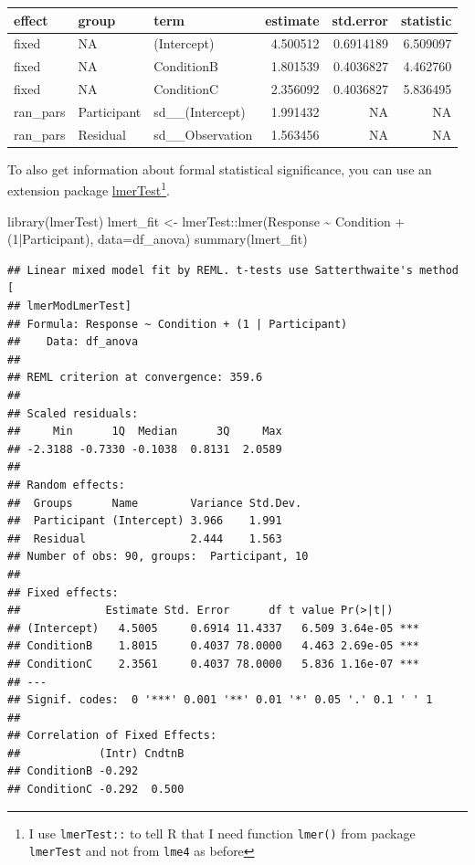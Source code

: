 \documentclass[
]{book}
\newenvironment{Shaded}{\begin{snugshade}}{\end{snugshade}}
\newcommand{\AttributeTok}[1]{\textcolor[rgb]{0.77,0.63,0.00}{#1}}
\newcommand{\DecValTok}[1]{\textcolor[rgb]{0.00,0.00,0.81}{#1}}
\newcommand{\FunctionTok}[1]{\textcolor[rgb]{0.00,0.00,0.00}{#1}}
\newcommand{\NormalTok}[1]{#1}
\newcommand{\OtherTok}[1]{\textcolor[rgb]{0.56,0.35,0.01}{#1}}
\newcommand{\SpecialCharTok}[1]{\textcolor[rgb]{0.00,0.00,0.00}{#1}}
\begin{document}
\begin{tabular}{l|l|l|r|r|r}
\hline
effect & group & term & estimate & std.error & statistic\\
\hline
fixed & NA & (Intercept) & 4.500512 & 0.6914189 & 6.509097\\
\hline
fixed & NA & ConditionB & 1.801539 & 0.4036827 & 4.462760\\
\hline
fixed & NA & ConditionC & 2.356092 & 0.4036827 & 5.836495\\
\hline
ran\_pars & Participant & sd\_\_(Intercept) & 1.991432 & NA & NA\\
\hline
ran\_pars & Residual & sd\_\_Observation & 1.563456 & NA & NA\\
\hline
\end{tabular}

To also get information about formal statistical significance, you can use an extension package \href{https://github.com/runehaubo/lmerTestR}{lmerTest}\footnote{I use \texttt{lmerTest::} to tell R that I need function \texttt{lmer()} from package \texttt{lmerTest} and not from \texttt{lme4} as before}.

\begin{Shaded}
\begin{Highlighting}[]
\FunctionTok{library}\NormalTok{(lmerTest)}
\NormalTok{lmert\_fit }\OtherTok{\textless{}{-}}\NormalTok{ lmerTest}\SpecialCharTok{::}\FunctionTok{lmer}\NormalTok{(Response }\SpecialCharTok{\textasciitilde{}}\NormalTok{ Condition }\SpecialCharTok{+}\NormalTok{ (}\DecValTok{1}\SpecialCharTok{|}\NormalTok{Participant), }\AttributeTok{data=}\NormalTok{df\_anova)}
\FunctionTok{summary}\NormalTok{(lmert\_fit)}
\end{Highlighting}
\end{Shaded}

\begin{verbatim}
## Linear mixed model fit by REML. t-tests use Satterthwaite's method [
## lmerModLmerTest]
## Formula: Response ~ Condition + (1 | Participant)
##    Data: df_anova
## 
## REML criterion at convergence: 359.6
## 
## Scaled residuals: 
##     Min      1Q  Median      3Q     Max 
## -2.3188 -0.7330 -0.1038  0.8131  2.0589 
## 
## Random effects:
##  Groups      Name        Variance Std.Dev.
##  Participant (Intercept) 3.966    1.991   
##  Residual                2.444    1.563   
## Number of obs: 90, groups:  Participant, 10
## 
## Fixed effects:
##             Estimate Std. Error      df t value Pr(>|t|)    
## (Intercept)   4.5005     0.6914 11.4337   6.509 3.64e-05 ***
## ConditionB    1.8015     0.4037 78.0000   4.463 2.69e-05 ***
## ConditionC    2.3561     0.4037 78.0000   5.836 1.16e-07 ***
## ---
## Signif. codes:  0 '***' 0.001 '**' 0.01 '*' 0.05 '.' 0.1 ' ' 1
## 
## Correlation of Fixed Effects:
##            (Intr) CndtnB
## ConditionB -0.292       
## ConditionC -0.292  0.500
\end{verbatim}
\end{document}
